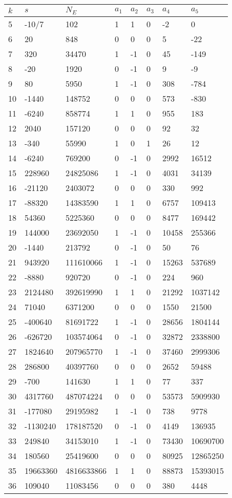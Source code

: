 \documentclass{amsart}
\begin{document}
\begin{longtable}{|l|l|l|lllll|}
\hline
$k$ & $s$ & $N_E$ & $a_1$ & $a_2$ & $a_3$ & $a_4$ & $a_5$\\
\hline
5&-10/7&102&1&1&0&-2&0\\
6&20&848&0&0&0&5&-22\\
7&320&34470&1&-1&0&45&-149\\
8&-20&1920&0&-1&0&9&-9\\
9&80&5950&1&-1&0&308&-784\\
10&-1440&148752&0&0&0&573&-830\\
11&-6240&858774&1&1&0&955&183\\
12&2040&157120&0&0&0&92&32\\
13&-340&55990&1&0&1&26&12\\
14&-6240&769200&0&-1&0&2992&16512\\
15&228960&24825086&1&-1&0&4031&34139\\
16&-21120&2403072&0&0&0&330&992\\
17&-88320&14383590&1&1&0&6757&109413\\
18&54360&5225360&0&0&0&8477&169442\\
19&144000&23692050&1&-1&0&10458&255366\\
20&-1440&213792&0&-1&0&50&76\\
21&943920&111610066&1&-1&0&15263&537689\\
22&-8880&920720&0&-1&0&224&960\\
23&2124480&392619990&1&1&0&21292&1037142\\
24&71040&6371200&0&0&0&1550&21500\\
25&-400640&81691722&1&-1&0&28656&1804144\\
26&-626720&103574064&0&-1&0&32872&2338800\\
27&1824640&207965770&1&-1&0&37460&2999306\\
28&286800&40397760&0&0&0&2652&59488\\
29&-700&141630&1&1&0&77&337\\
30&4317760&487074224&0&0&0&53573&5909930\\
31&-177080&29195982&1&-1&0&738&9778\\
32&-1130240&178187520&0&-1&0&4149&136935\\
33&249840&34153010&1&-1&0&73430&10690700\\
34&180560&25419600&0&0&0&80925&12865250\\
35&19663360&4816633866&1&1&0&88873&15393015\\
36&109040&11083456&0&0&0&380&4448\\

\end{longtable}
\end{document}
